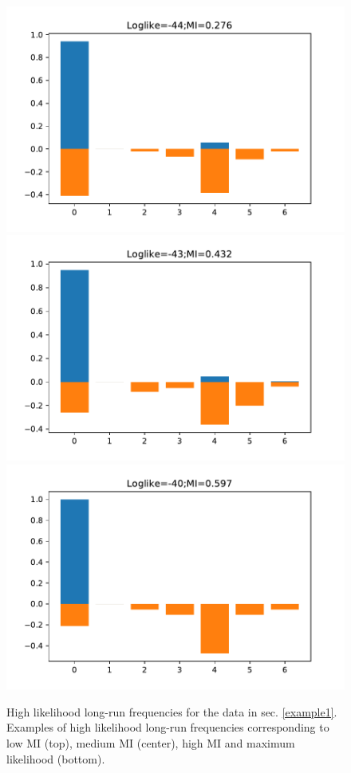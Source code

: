 \begin{figure}
\centering
\includegraphics[scale=0.5]{HighLike_Plots1.pdf}\\ 
\includegraphics[scale=0.5]{HighLike_Plots0.pdf}\\
\includegraphics[scale=0.5]{HighLike_Plots_MaxLike.pdf} 
\label{fig:highlike_long-run_freqs}
\caption{High likelihood long-run frequencies for the data in sec. \ref{example1}. Examples of high likelihood long-run frequencies corresponding to low MI (top), medium MI (center), high MI and maximum likelihood (bottom). }
\end{figure}

